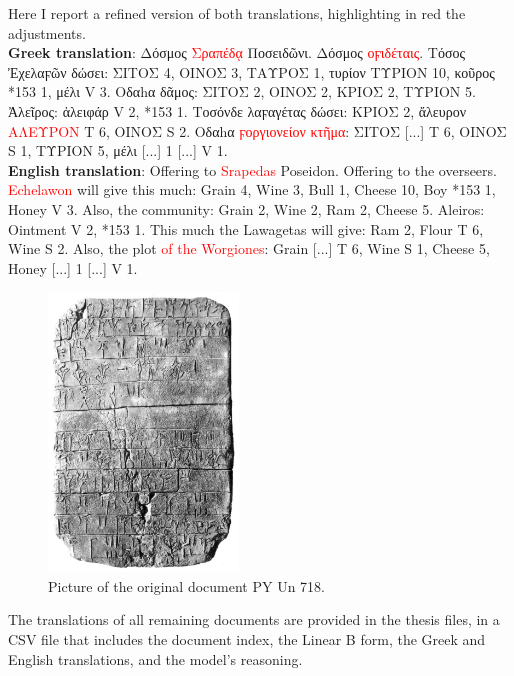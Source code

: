 Here I report a refined version of both translations, highlighting in red the adjustments. \\
\textbf{Greek translation}: \textgreek{Δόσμος} \textcolor{red}{\textgreek{Σραπέδᾳ}} \textgreek{Ποσειδῶνι. Δόσμος} \textcolor{red}{\textgreek{οϝιδέταις}}\textgreek{. Τόσος Ἐχελαϝῶν δώσει: ΣΙΤΟΣ 4, ΟΙΝΟΣ 3, ΤΑΥΡΟΣ 1, τυρίον ΤΥΡΙΟΝ 10, κοῦρος *153 1, μέλι V 3. Οδαhα δᾶμος: ΣΙΤΟΣ 2, ΟΙΝΟΣ 2, ΚΡΙΟΣ 2, ΤΥΡΙΟΝ 5. Ἀλεῖρος: ἀλειφάρ V 2, *153 1. Τοσόνδε λαϝαγέτας δώσει: ΚΡΙΟΣ 2, ἄλευρον} \textcolor{red}{\textgreek{ΑΛΕΥΡΟΝ}} \textgreek{T 6, ΟΙΝΟΣ S 2. Οδαhα} \textcolor{red}{\textgreek{ϝοργιονείον κτῆμα}}\textgreek{: ΣΙΤΟΣ [...] T 6, ΟΙΝΟΣ S 1, ΤΥΡΙΟΝ 5, μέλι [...] 1 [...] V 1.} \\
\textbf{English translation}: Offering to \textcolor{red}{Srapedas} Poseidon. Offering to the overseers. \textcolor{red}{Echelawon} will give this much: Grain 4, Wine 3, Bull 1, Cheese 10, Boy *153 1, Honey V 3. Also, the community: Grain 2, Wine 2, Ram 2, Cheese 5. Aleiros: Ointment V 2, *153 1. This much the Lawagetas will give: Ram 2, Flour T 6, Wine S 2. Also, the plot \textcolor{red}{of the Worgiones}: Grain [...] T 6, Wine S 1, Cheese 5, Honey [...] 1 [...] V 1.

\begin{figure}[H]
  \centering
  \includegraphics[width=0.45\textwidth]{Images/5385.png} %
  \caption{Picture of the original document PY Un 718.}
  \label{fig:doc12}
\end{figure}

The translations of all remaining documents are provided in the thesis files, in a CSV file that includes the document index, the Linear B form, the Greek and English translations, and the model's reasoning.

